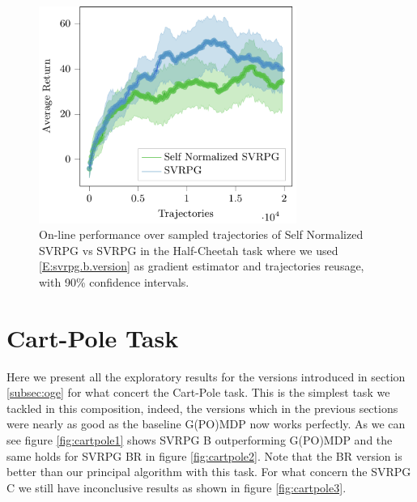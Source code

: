 \begin{figure}[h]
	\begin{minipage}[h]{1\textwidth}
		\centering
		\includegraphics[width=0.75\textwidth]{Images/Experiments/swimmer_SVRPG_vs_SN_SVRPG_B_reuse.pdf}
		\vspace{-0.1in}
		\caption{On-line performance over sampled trajectories of Self Normalized \acs{SVRPG} vs \acs{SVRPG} in the Half-Cheetah task where we used \ref{E:svrpg.b.version} as gradient estimator and trajectories reusage, with 90\% confidence intervals.}
		\label{fig:swimmereleven}
	\end{minipage}
	\vspace{-0.15in}
\end{figure}



\clearpage
\vspace{-0.05in}
\section{Cart-Pole Task}
\vspace{-0.05in}
Here we present all the exploratory results for the versions introduced in section \ref{subsec:oge} for what concert the Cart-Pole task. This is the simplest task we tackled in this composition, indeed, the versions which in the previous sections were nearly as good as the baseline G(PO)MDP now works perfectly. As we can see figure \ref{fig:cartpole1} shows \acs{SVRPG} B outperforming G(PO)MDP and the same holds for \acs{SVRPG} BR in figure \ref{fig:cartpole2}. Note that the BR version is better than our principal algorithm with this task. For what concern the \acs{SVRPG} C we still have inconclusive results as shown in figure \ref{fig:cartpole3}.

